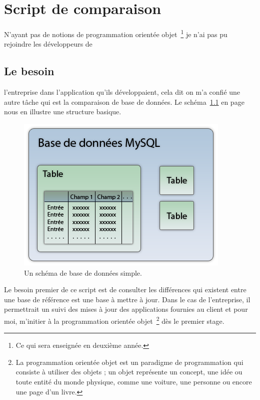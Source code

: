 \chapter{Script de comparaison} %
\label{cha:Script de comparaison}

N'ayant pas de notions de programmation orientée objet\, \footnote{Ce qui sera
enseignée en deuxième année.} je n'ai pas pu rejoindre les développeurs de
\section{Le besoin} %
\label{sec:Le besoin}

l'entreprise dans l'application qu'ils développaient, cela dit on m'a confié
une autre tâche qui est la comparaison de base de données. Le schéma~\ref{bdd}
en page~\pageref{bdd} nous en illustre une structure basique.

\begin{figure}
\begin{center}
\includegraphics[scale=0.5]{images/bdd.png}
\end{center}
\caption{Un schéma de base de données simple.}
\label{bdd}
\end{figure}

Le besoin premier de ce script est de consulter les différences qui existent
entre une base de référence est une base à mettre à jour. Dans le cas de
l'entreprise, il permettrait un suivi des mises à jour des applications
fournies au client et pour moi, m'initier à la programmation orientée objet\,
\footnote{La programmation orientée objet est un paradigme de programmation qui
consiste à utiliser des objets ; un objet représente un concept, une idée ou
toute entité du monde physique, comme une voiture, une personne ou encore une
page d'un livre.} dès le premier stage.
